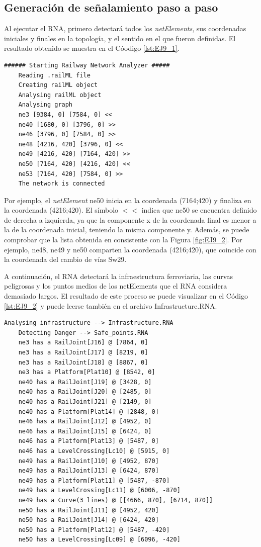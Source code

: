 \subsection{Generación de señalamiento paso a paso}

Al ejecutar el RNA, primero detectará todos los \textit{netElements}, sus coordenadas iniciales y finales en la topología, y el sentido en el que fueron definidas. El resultado obtenido se muestra en el Cóodigo \ref{lst:EJ9_1}.

\begin{lstlisting}[language = {}, caption = Detección de \textit{netElements} por parte del RNA , label = {lst:EJ9_1}]
	###### Starting Railway Network Analyzer #####
	Reading .railML file
	Creating railML object
	Analysing railML object
	Analysing graph
	ne3 [9384, 0] [7584, 0] <<
	ne40 [1680, 0] [3796, 0] >>
	ne46 [3796, 0] [7584, 0] >>
	ne48 [4216, 420] [3796, 0] <<
	ne49 [4216, 420] [7164, 420] >>
	ne50 [7164, 420] [4216, 420] <<
	ne53 [7164, 420] [7584, 0] >>
	The network is connected
\end{lstlisting}

Por ejemplo, el \textit{netElement} ne50 inicia en la coordenada (7164;420) y finaliza en la coordenada (4216;420). El símbolo $<<$ indica que ne50 se encuentra definido de derecha a izquierda, ya que la componente x de la coordenada final es menor a la de la coordenada inicial, teniendo la misma componente y. Además, se puede comprobar que la lista obtenida en consistente con la Figura \ref{fig:EJ9_2}. Por ejemplo, ne48, ne49 y ne50 comparten la coordenada (4216;420), que coincide con la coordenada del cambio de vías Sw29.

A continuación, el RNA detectará la infraestructura ferroviaria, las curvas peligrosas y los puntos medios de los netElements que el RNA considera demasiado largos. El resultado de este proceso se puede visualizar en el Código \ref{lst:EJ9_2} y puede leerse también en el archivo Infrastructure.RNA.

\begin{lstlisting}[language = {}, caption = Detección de puntos críticos por parte del RNA , label = {lst:EJ9_2}]
	Analysing infrastructure --> Infrastructure.RNA
	Detecting Danger --> Safe_points.RNA
	ne3 has a RailJoint[J16] @ [7864, 0]
	ne3 has a RailJoint[J17] @ [8219, 0]
	ne3 has a RailJoint[J18] @ [8867, 0]
	ne3 has a Platform[Plat10] @ [8542, 0]
	ne40 has a RailJoint[J19] @ [3428, 0]
	ne40 has a RailJoint[J20] @ [2485, 0]
	ne40 has a RailJoint[J21] @ [2149, 0]
	ne40 has a Platform[Plat14] @ [2848, 0]
	ne46 has a RailJoint[J12] @ [4952, 0]
	ne46 has a RailJoint[J15] @ [6424, 0]
	ne46 has a Platform[Plat13] @ [5487, 0]
	ne46 has a LevelCrossing[Lc10] @ [5915, 0]
	ne49 has a RailJoint[J10] @ [4952, 870]
	ne49 has a RailJoint[J13] @ [6424, 870]
	ne49 has a Platform[Plat11] @ [5487, -870]
	ne49 has a LevelCrossing[Lc11] @ [6006, -870]
	ne49 has a Curve(3 lines) @ [[4666, 870], [6714, 870]]
	ne50 has a RailJoint[J11] @ [4952, 420]
	ne50 has a RailJoint[J14] @ [6424, 420]
	ne50 has a Platform[Plat12] @ [5487, -420]
	ne50 has a LevelCrossing[Lc09] @ [6096, -420]
\end{lstlisting}

